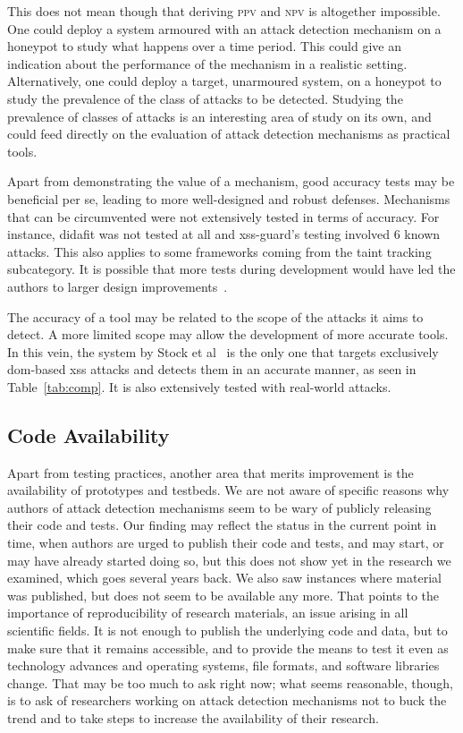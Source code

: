 \documentclass[conference]{IEEEtran}
\begin{document}
This does not mean though that deriving \textsc{ppv} and \textsc{npv} is
altogether impossible. One could deploy a system armoured with an
attack detection mechanism on a honeypot to study what happens over
a time period. This could give an indication about the performance of
the mechanism in a realistic setting. Alternatively, one could deploy a
target, unarmoured system, on a honeypot to study the prevalence of
the class of attacks to be detected. Studying the prevalence of
classes of attacks is an interesting area of study on its own,
and could feed directly on the evaluation of attack detection
mechanisms as practical tools.

Apart from demonstrating the value of a mechanism, good accuracy tests
may be beneficial per se, leading to more well-designed and robust
defenses. Mechanisms that can be circumvented were not extensively
tested in terms of accuracy. For instance, {\sc didafit} was not
tested at all and {\sc xss-guard}'s testing involved 6 known attacks.
This also applies to some frameworks coming from the taint tracking
subcategory. It is possible that more tests during development would
have led the authors to larger design improvements~\cite{Van14}.

The accuracy of a tool may be related to the scope of the attacks it
aims to detect. A more limited scope may allow the development of more
accurate tools. In this vein, the system by Stock et al~\cite{SLMS14}
is the only one that targets exclusively {\sc dom}-based {\sc xss}
attacks and detects them in an accurate manner, as seen in
Table~\ref{tab:comp}. It is also extensively tested with real-world
attacks.

\subsection{Code Availability}

Apart from testing practices, another area that merits improvement is
the availability of prototypes and testbeds. We are not aware of
specific reasons why authors of attack detection mechanisms seem to be
wary of publicly releasing their code and tests. Our finding may reflect
the status in the current point in time, when authors are urged to
publish their code and tests, and may start, or may have already
started doing so, but this does not show yet in the research we
examined, which goes several years back. We also saw instances where
material was published, but does not seem to be available any more.
That points to the importance of reproducibility of research materials, 
an issue arising in all scientific fields. It is not enough to
publish the underlying code and data, but to make sure that it remains
accessible, and to provide the means to test it even as technology
advances and operating systems, file formats, and software libraries
change. That may be too much to ask right now; what seems reasonable,
though, is to ask of researchers working on attack detection mechanisms not to
buck the trend and to take steps to increase the availability of their
research.
\end{document}
